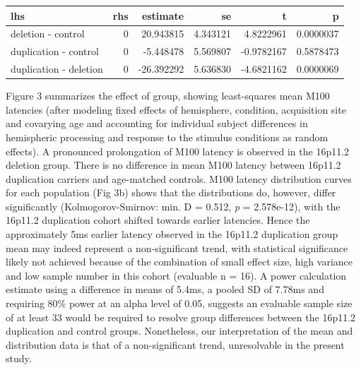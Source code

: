 \documentclass[]{article}
\begin{document}
\begin{longtable}[c]{@{}lrrrrr@{}}
\toprule
lhs & rhs & estimate & se & t & p\tabularnewline
\midrule
\endhead
deletion - control & 0 & 20.943815 & 4.343121 & 4.8222961 &
0.0000037\tabularnewline
duplication - control & 0 & -5.448478 & 5.569807 & -0.9782167 &
0.5878473\tabularnewline
duplication - deletion & 0 & -26.392292 & 5.636830 & -4.6821162 &
0.0000069\tabularnewline
\bottomrule
\end{longtable}

Figure 3 summarizes the effect of group, showing least-squares mean M100
latencies (after modeling fixed effects of hemisphere, condition,
acquisition site and covarying age and accounting for individual subject
differences in hemispheric processing and response to the stimulus
conditions as random effects). A pronounced prolongation of M100 latency
is observed in the 16p11.2 deletion group. There is no difference in
mean M100 latency between 16p11.2 duplication carriers and age-matched
controls. M100 latency distribution curves for each population (Fig 3b)
shows that the distributions do, however, differ significantly
(Kolmogorov-Smirnov: min. D = 0.512, \emph{p} = 2.578e-12), with the
16p11.2 duplication cohort shifted towards earlier latencies. Hence the
approximately 5ms earlier latency observed in the 16p11.2 duplication
group mean may indeed represent a non-significant trend, with
statistical significance likely not achieved because of the combination
of small effect size, high variance and low sample number in this cohort
(evaluable n = 16). A power calculation estimate using a difference in
means of 5.4ms, a pooled SD of 7.78ms and requiring 80\% power at an
alpha level of 0.05, suggests an evaluable sample size of at least 33
would be required to resolve group differences between the 16p11.2
duplication and control groups. Nonetheless, our interpretation of the
mean and distribution data is that of a non-significant trend,
unresolvable in the present study.
\end{document}
